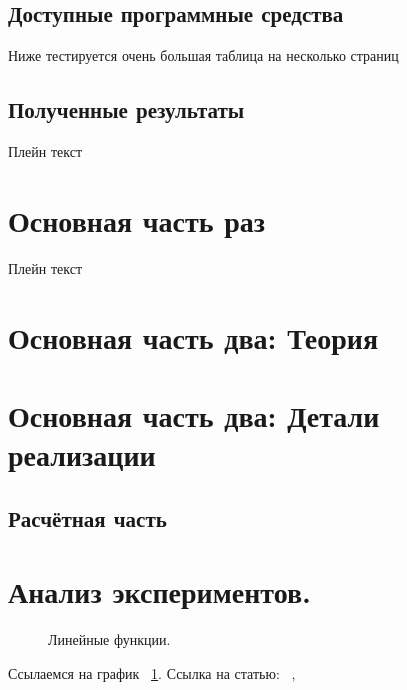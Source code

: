 \documentclass[a4paper,article,14pt]{extarticle}
\begin{document}
\subsection{Доступные программные средства}

Ниже тестируется очень большая таблица на несколько страниц


\subsection{Полученные результаты}

Плейн текст

\section{Основная часть раз}

Плейн текст

\pagebreak
\section{Основная часть два: Теория}


\section{Основная часть два: Детали реализации}
\subsection{Расчётная часть}

\section{Анализ экспериментов.}
\begin{figure}[ht]
\begin{center}

\caption{
\label{graph-fig}
     Линейные функции.}
\end {center}
\end {figure}
Ссылаемся на график ~\ref{graph-fig}.
Ссылка на статью: ~\cite{voc}, ~\cite{vo2}
\end{document}
